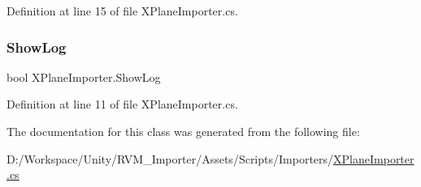 Definition at line 15 of file X\+Plane\+Importer.\+cs.

\mbox{\label{class_x_plane_importer_aff6827a1593ac6524589b2985aa24615}} 
\subsubsection{\texorpdfstring{ShowLog}{ShowLog}}
{\footnotesize\ttfamily bool X\+Plane\+Importer.\+Show\+Log}



Definition at line 11 of file X\+Plane\+Importer.\+cs.



The documentation for this class was generated from the following file\+:\begin{DoxyCompactItemize}
\item 
D\+:/\+Workspace/\+Unity/\+R\+V\+M\+\_\+\+Importer/\+Assets/\+Scripts/\+Importers/\mbox{\hyperlink{_x_plane_importer_8cs}{X\+Plane\+Importer.\+cs}}\end{DoxyCompactItemize}
